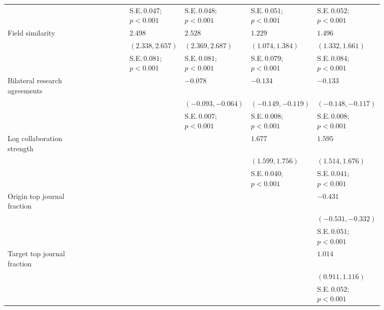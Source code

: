 \begin{table}[H]
{\begin{tabular}{p{0.2\linewidth}p{0.11\linewidth}p{0.11\linewidth}p{0.11\linewidth}p{0.11\linewidth}p{0.11\linewidth}p{0.11\linewidth}}
 &  &  & S.E.\,$0.047$; ${p < 0.001}$ & S.E.\,$0.048$; ${p < 0.001}$ & S.E.\,$0.051$; ${p < 0.001}$ & S.E.\,$0.052$; ${p < 0.001}$\\ [0.8ex]  
Field similarity &  &  & $2.498$ & $2.528$ & $1.229$ & $1.496$\\ 
 &  &  & $(2.338, 2.657)$ & $(2.369, 2.687)$ & $(1.074, 1.384)$ & $(1.332, 1.661)$\\ 
 &  &  & S.E.\,$0.081$; ${p < 0.001}$ & S.E.\,$0.081$; ${p < 0.001}$ & S.E.\,$0.079$; ${p < 0.001}$ & S.E.\,$0.084$; ${p < 0.001}$\\ [0.8ex]  
Bilateral research agreements &  &  &  & $-0.078$ & $-0.134$ & $-0.133$\\ 
 &  &  &  & $(-0.093, -0.064)$ & $(-0.149, -0.119)$ & $(-0.148, -0.117)$\\ 
 &  &  &  & S.E.\,$0.007$; ${p < 0.001}$ & S.E.\,$0.008$; ${p < 0.001}$ & S.E.\,$0.008$; ${p < 0.001}$\\ [0.8ex]  
Log collaboration strength &  &  &  &  & $1.677$ & $1.595$\\ 
 &  &  &  &  & $(1.599, 1.756)$ & $(1.514, 1.676)$\\ 
 &  &  &  &  & S.E.\,$0.040$; ${p < 0.001}$ & S.E.\,$0.041$; ${p < 0.001}$\\ [0.8ex]  
Origin top journal fraction &  &  &  &  &  & $-0.431$\\ 
 &  &  &  &  &  & $(-0.531, -0.332)$\\ 
 &  &  &  &  &  & S.E.\,$0.051$; ${p < 0.001}$\\ [0.8ex]  
Target top journal fraction &  &  &  &  &  & $1.014$\\ 
 &  &  &  &  &  & $(0.911, 1.116)$\\ 
 &  &  &  &  &  & S.E.\,$0.052$; ${p < 0.001}$\\ [0.8ex]  
\hline 
\end{tabular}
}
\end{table}
